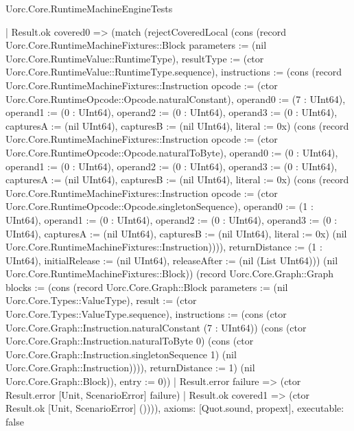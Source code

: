 \begin{lexlean}{Uorc.Core.RuntimeMachineEngineTests}
\begin{semanticmodule}
{    | Result.ok covered0 => (match (rejectCoveredLocal (cons (record Uorc.Core.RuntimeMachineFixtures::Block {parameters := (nil Uorc.Core.RuntimeValue::RuntimeType), resultType := (ctor Uorc.Core.RuntimeValue::RuntimeType.sequence), instructions := (cons (record Uorc.Core.RuntimeMachineFixtures::Instruction {opcode := (ctor Uorc.Core.RuntimeOpcode::Opcode.naturalConstant), operand0 := (7 : UInt64), operand1 := (0 : UInt64), operand2 := (0 : UInt64), operand3 := (0 : UInt64), capturesA := (nil UInt64), capturesB := (nil UInt64), literal := 0x}) (cons (record Uorc.Core.RuntimeMachineFixtures::Instruction {opcode := (ctor Uorc.Core.RuntimeOpcode::Opcode.naturalToByte), operand0 := (0 : UInt64), operand1 := (0 : UInt64), operand2 := (0 : UInt64), operand3 := (0 : UInt64), capturesA := (nil UInt64), capturesB := (nil UInt64), literal := 0x}) (cons (record Uorc.Core.RuntimeMachineFixtures::Instruction {opcode := (ctor Uorc.Core.RuntimeOpcode::Opcode.singletonSequence), operand0 := (1 : UInt64), operand1 := (0 : UInt64), operand2 := (0 : UInt64), operand3 := (0 : UInt64), capturesA := (nil UInt64), capturesB := (nil UInt64), literal := 0x}) (nil Uorc.Core.RuntimeMachineFixtures::Instruction)))), returnDistance := (1 : UInt64), initialRelease := (nil UInt64), releaseAfter := (nil (List UInt64))}) (nil Uorc.Core.RuntimeMachineFixtures::Block)) (record Uorc.Core.Graph::Graph {blocks := (cons (record Uorc.Core.Graph::Block {parameters := (nil Uorc.Core.Types::ValueType), result := (ctor Uorc.Core.Types::ValueType.sequence), instructions := (cons (ctor Uorc.Core.Graph::Instruction.naturalConstant (7 : UInt64)) (cons (ctor Uorc.Core.Graph::Instruction.naturalToByte 0) (cons (ctor Uorc.Core.Graph::Instruction.singletonSequence 1) (nil Uorc.Core.Graph::Instruction)))), returnDistance := 1}) (nil Uorc.Core.Graph::Block)), entry := 0}))
      | Result.error failure => (ctor Result.error [Unit, ScenarioError] failure)
      | Result.ok covered1 => (ctor Result.ok [Unit, ScenarioError] ()))),
  axioms: [Quot.sound, propext],
  executable: false
}


\end{semanticmodule}
\end{lexlean}
